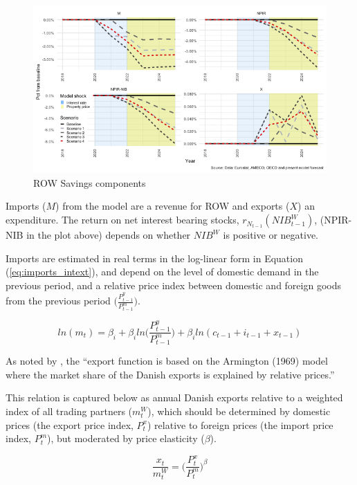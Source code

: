 \documentclass[
]{book}
\begin{document}
\begin{figure}[H]
\includegraphics[width=0.95\linewidth]{figures/fl-fi-sfc-plot-row-indicators-savings-1} \caption{ROW Savings components}\label{fig:fl-fi-sfc-plot-row-indicators-savings}
\end{figure}

Imports (\(M\)) from the model are a revenue for ROW and exports (\(X\)) an expenditure. The return on net interest bearing stocks, \(r_{N_{t-1}}(NIB^W_{t-1})\), (NPIR-NIB in the plot above) depends on whether \(NIB^W\) is positive or negative.

Imports are estimated in real terms in the log-linear form in Equation (\ref{eq:imports_intext}), and depend on the level of domestic demand in the previous period, and a relative price index between domestic and foreign goods from the previous period \(\Bigg( \frac{P^y_{t-1}}{P^m_{t-1}} \Bigg)\).

\begin{equation}
ln(m_t) = \beta _i + \beta _iln \Bigg( \frac{P^y_{t-1}}{P^m_{t-1}} \Bigg) + \beta _iln(c_{t-1} + i_{t-1} + x_{t-1})
\label{eq:imports_intext}
\end{equation}

As noted by \citet{byrialsenraza2019empirical}, the ``export function is based on the
Armington (1969) model where the market share of the Danish exports is explained by
relative prices.''

This relation is captured below as annual Danish exports relative to a weighted index
of all trading partners (\(m^W_t\)), which should be determined by domestic prices
(the export price index, \(P^x_t\)) relative to foreign prices (the import price
index, \(P^m_t\)), but moderated by price elasticity (\(\beta\)).

\begin{equation}
\frac{x_t}{m^W_t} = \Bigg( \frac{P^x_t}{P^m_t}\Bigg)^ \beta
\end{equation}
\end{document}
